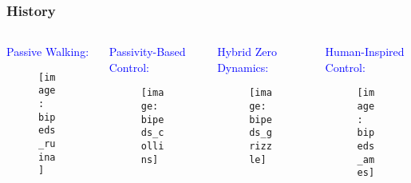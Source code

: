 \begin{frame}[t]
  \frametitle{History}
  \begin{columns}

    \begin{column}{.24\textwidth}
      \textcolor{blue}{Passive Walking:}
      \begin{figure}
        \centering
        \texttt{[image: bipeds\_ruina]}
      \end{figure}
    \end{column}

    \begin{column}{.24\textwidth}
      \textcolor{blue}{Passivity-Based Control:}
      \begin{figure}
        \centering
        \texttt{[image: bipeds\_collins]}
      \end{figure}
    \end{column}

    \begin{column}{.24\textwidth}
      \textcolor{blue}{Hybrid Zero Dynamics:}
      \begin{figure}
        \centering
        \texttt{[image: bipeds\_grizzle]}
      \end{figure}
    \end{column}

    \begin{column}{.24\textwidth}
      \textcolor{blue}{Human-Inspired Control:}
      \begin{figure}
        \centering
        \texttt{[image: bipeds\_ames]}
      \end{figure}
    \end{column}

  \end{columns}
\end{frame}
